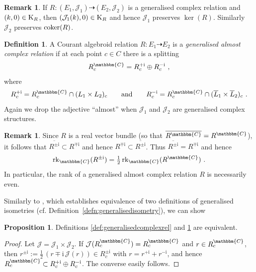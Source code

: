\documentclass[a4paper, reqno, 11pt]{amsart}
\numberwithin{equation}{section}
\theoremstyle{definition}
\newtheorem{definition}[equation]{Definition}
\newtheorem{proposition}[equation]{Proposition}
\newtheorem{remark}[equation]{Remark}
\newcommand{\ii}{\mathrm{i}}
\newcommand{\IC}{\mathbbm{C}}
\newcommand{\cJ}{{\mathcal J}}
\newcommand{\rel}{\dashrightarrow}
\newcommand{\rk}{\mathrm{rk}}
\theoremstyle{remark}
\begin{document}
\begin{remark}\label{rem:kernelspreserved}
    If $R \colon (E_1, \cJ_1) \rel (E_2, \cJ_2)$ is a generalised complex relation and $(k,0) \in {\rm K}_R$, then $(\cJ_1(k),0) \in {\rm K}_R$ and hence $\cJ_1$ preserves $\ker(R)$. Similarly $\cJ_2$ preserves ${\rm coker}(R)$.
\end{remark}

\begin{definition} \label{def:splitGCR}
    A Courant algebroid relation $R \colon E_1 \rel E_2$ is a \emph{generalised almost complex relation} if at each point $c\in C$ there is a splitting
    \begin{align}\label{eqn:splitGCR}
        R^\IC_c = R^{+\ii}_c \oplus R^{-\ii}_c \ , 
    \end{align}
    where $$R^{+\ii}_c = R^\IC_c\cap (L_1 \times L_2)_c \qquad \text{and} \qquad R^{-\ii}_c = R^\IC_c \cap (\overline{L}_1 \times \overline{L}_2)_c \ . $$ Again we drop the adjective \enquote{almost} when $\cJ_1$ and $\cJ_2$ are generalised complex structures.
\end{definition}

\begin{remark}\label{rmk:ranksofRi}
    Since $R$ is a real vector bundle (so that $\overline{R^\IC} = R^\IC$), it follows that $\overline{R^{\pm\ii}} \subset R^{\mp\ii}$ and hence $R^{\mp\ii} \subset \overline{R^{\pm\ii}}$. Thus $\overline{R^{\pm\ii}} = R^{\mp\ii}$ and  hence $$\rk_\IC(R^{\pm\ii}) = \tfrac 12\,\rk_\IC(R^\IC) \ . $$
    In particular, the rank of a generalised almost complex relation $R$ is necessarily even.
\end{remark}

Similarly to \cite[Proposition 4.15]{DeFraja:2023fhe}, which establishes equivalence of two definitions of generalised isometries (cf. Definition~\ref{defn:generalisedisometry}), we can show

\begin{proposition} \label{prop:equivGCRdefs}
     Definitions \ref{def:generalisedcomplexrel} and \ref{def:splitGCR} are equivalent.
\end{proposition}

\begin{proof}
    Let $\cJ=\cJ_1\times\cJ_2$. If $\cJ(R^\IC_c) = R^\IC_c$ and $r\in R^\IC_c$, then $r^{\pm\ii}:=\frac12\,(r\mp\ii\,\cJ(r))\in R_c^{\pm\ii}$ with $r=r^{+\ii}+r^{-\ii}$, and hence $R_c^\IC \subset R^{+\ii}_c \oplus R^{-\ii}_c$. The converse easily follows. 
\end{proof}
\end{document}
